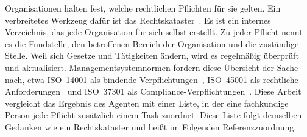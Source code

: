 Organisationen halten fest, welche rechtlichen Pflichten für sie gelten.
Ein verbreitetes Werkzeug dafür ist das Rechtskataster~\cite{lfu_rechtskataster,ihk_rechtskataster}.
Es ist ein internes Verzeichnis, das jede Organisation für sich selbst erstellt.
Zu jeder Pflicht nennt es die Fundstelle, den betroffenen Bereich der Organisation und die zuständige Stelle.
Weil sich Gesetze und Tätigkeiten ändern, wird es regelmäßig überprüft und aktualisiert.
Managementsystemnormen fordern diese Übersicht der Sache nach, etwa ISO~14001 als bindende Verpflichtungen~\cite{iso14001}, ISO~45001 als rechtliche Anforderungen~\cite{iso45001} und ISO~37301 als Compliance-Verpflichtungen~\cite{iso37301}.
Diese Arbeit vergleicht das Ergebnis des Agenten mit einer Liste, in der eine fachkundige Person jede Pflicht zusätzlich einem Task zuordnet.
Diese Liste folgt demselben Gedanken wie ein Rechtskataster und heißt im Folgenden Referenzzuordnung.

